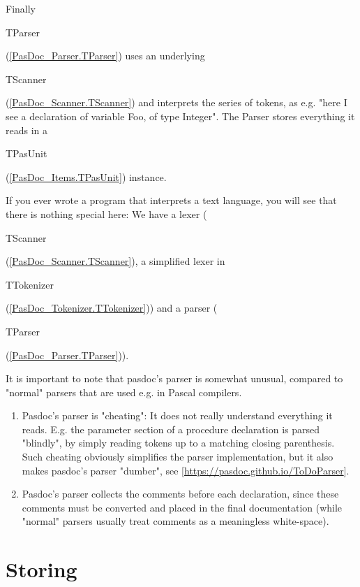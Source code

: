 \documentclass{report}
\begin{document}
Finally \begin{ttfamily}TParser\end{ttfamily}(\ref{PasDoc_Parser.TParser}) uses an underlying \begin{ttfamily}TScanner\end{ttfamily}(\ref{PasDoc_Scanner.TScanner}) and interprets the series of tokens, as e.g. "here I see a declaration of variable Foo, of type Integer". The Parser stores everything it reads in a \begin{ttfamily}TPasUnit\end{ttfamily}(\ref{PasDoc_Items.TPasUnit}) instance.

If you ever wrote a program that interprets a text language, you will see that there is nothing special here: We have a lexer (\begin{ttfamily}TScanner\end{ttfamily}(\ref{PasDoc_Scanner.TScanner}), a simplified lexer in \begin{ttfamily}TTokenizer\end{ttfamily}(\ref{PasDoc_Tokenizer.TTokenizer})) and a parser (\begin{ttfamily}TParser\end{ttfamily}(\ref{PasDoc_Parser.TParser})).

It is important to note that pasdoc's parser is somewhat unusual, compared to "normal" parsers that are used e.g. in Pascal compilers.

\begin{enumerate}
\setcounter{enumi}{0} \setcounter{enumii}{0} \setcounter{enumiii}{0} \setcounter{enumiv}{0} 
\item  Pasdoc's parser is "cheating": It does not really understand everything it reads. E.g. the parameter section of a procedure declaration is parsed "blindly", by simply reading tokens up to a matching closing parenthesis. Such cheating obviously simplifies the parser implementation, but it also makes pasdoc's parser "dumber", see [\href{https://pasdoc.github.io/ToDoParser}{https://pasdoc.github.io/ToDoParser}].
\setcounter{enumi}{1} \setcounter{enumii}{1} \setcounter{enumiii}{1} \setcounter{enumiv}{1} 
\item  Pasdoc's parser collects the comments before each declaration, since these comments must be converted and placed in the final documentation (while "normal" parsers usually treat comments as a meaningless white{-}space).
\end{enumerate}

\label{SecStoring}
\section{Storing}
\end{document}
